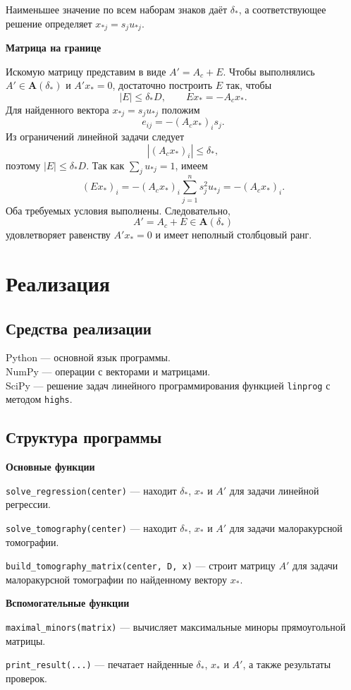 \documentclass[12pt,a4paper]{article}
\numberwithin{equation}{section}
\newcommand{\theorypart}[1]{%
    \par\medskip
    \noindent\textbf{#1}\par\nopagebreak\smallskip
}
\begin{document}
Наименьшее значение по всем наборам знаков даёт $\delta_*$, а
соответствующее решение определяет
$x_{*j}=s_ju_{*j}$.

\theorypart{Матрица на границе}
Искомую матрицу представим в виде $A'=A_c+E$. Чтобы выполнялись
$A'\in\boldsymbol{A}(\delta_*)$ и $A'x_*=0$, достаточно построить
$E$ так, чтобы
\[
    |E|\leq\delta_*D,
    \qquad
    Ex_*=-A_cx_*.
\]
Для найденного вектора $x_{*j}=s_ju_{*j}$ положим
\[
    e_{ij}=-(A_cx_*)_i s_j.
\]
Из ограничений линейной задачи следует
\[
    |(A_cx_*)_i|\leq\delta_*,
\]
поэтому $|E|\leq\delta_*D$. Так как $\sum_j u_{*j}=1$, имеем
\[
    (Ex_*)_i
    =-(A_cx_*)_i\sum_{j=1}^{n}s_j^2u_{*j}
    =-(A_cx_*)_i.
\]
Оба требуемых условия выполнены. Следовательно,
\[
    A'=A_c+E\in\boldsymbol{A}(\delta_*)
\]
удовлетворяет равенству $A'x_*=0$ и имеет неполный столбцовый ранг.

\section{Реализация}

\subsection{Средства реализации}

\noindent
Python --- основной язык программы.\\
NumPy --- операции с векторами и матрицами.\\
SciPy --- решение задач линейного программирования функцией
\texttt{linprog} с методом \texttt{highs}.

\subsection{Структура программы}

\theorypart{Основные функции}
\noindent
\texttt{solve\_regression(center)} --- находит $\delta_*$, $x_*$ и $A'$
для задачи линейной регрессии.\par
\smallskip
\noindent
\texttt{solve\_tomography(center)} --- находит $\delta_*$, $x_*$ и $A'$
для задачи малоракурсной томографии.\par
\smallskip
\noindent
\texttt{build\_tomography\_matrix(center, D, x)} --- строит матрицу $A'$
для задачи малоракурсной томографии по найденному вектору $x_*$.

\theorypart{Вспомогательные функции}
\noindent
\texttt{maximal\_minors(matrix)} --- вычисляет максимальные миноры
прямоугольной матрицы.\par
\smallskip
\noindent
\texttt{print\_result(...)} --- печатает найденные $\delta_*$, $x_*$ и $A'$,
а также результаты проверок.
\end{document}
